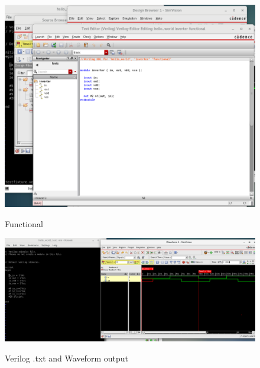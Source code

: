 \documentclass{article}
\begin{document}
\begin{figure}[h]
	\includegraphics[width =\textwidth]{functional.png}
	\label{functional}
	\caption{Functional}
\end{figure}

\begin{figure}[h]
	\includegraphics[width =\textwidth]{verilogoutput.png}
	\label{verilogoutput}
	\caption{Verilog .txt and Waveform output}
\end{figure}
\end{document}
